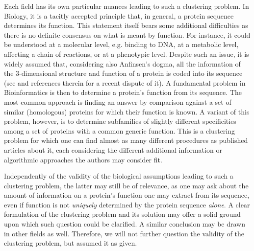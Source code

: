 \documentclass[twocolumn,aps,sort,nofootinbib]{revtex4}
\begin{document}
Each field has its own particular nuances leading to such
a clustering problem. 
In Biology, it is a tacitly accepted principle that, in general, a
protein sequence determines its function. This statement itself bears 
some additional difficulties as there is no definite consensus
on what is meant by function. For instance, it could be understood at 
a molecular level, e.g. binding to DNA, 
at a metabolic level, affecting a chain of reactions, or
at a phenotypic level. Despite such an issue, it is
widely assumed that, considering also Anfinsen's dogma, all the information
of the 3-dimensional structure and function of a protein is
coded into
its sequence (see \cite{BenNaim11} and references therein for a recent dispute of it). 
A fundamental problem in Bioinformatics is then to determine 
a protein's function from its sequence. The most common approach is
finding an answer by comparison against a set of similar (homologous) proteins for 
which their function is known. 
A variant of this problem, however, is to determine subfamilies of 
slightly different specificities among a set of proteins with a common
generic function. This is a clustering problem for which one can
find almost as many different procedures as published articles about it,
each considering the different additional information or algorithmic approaches
the authors may consider fit.

Independently of the validity of the biological assumptions leading to such
a clustering problem, the latter may still be of relevance, as one 
may ask about the amount of information on a protein's function one
may extract from its sequence, even if function is not {\sl uniquely} determined
by the protein sequence {\sl alone}. A clear formulation of the clustering
problem and its solution may offer a solid ground upon which such question
could be clarified. A similar conclusion may be drawn in other fields
as well. Therefore, we will not further question the validity
of the clustering problem, but assumed it as given.
\end{document}
